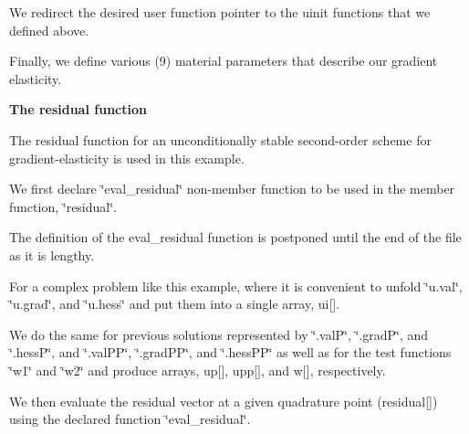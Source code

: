We redirect the desired user function pointer to the {\ttfamily uinit} functions that we defined above.


\begin{DoxyCodeInclude}

\end{DoxyCodeInclude}


Finally, we define various (9) material parameters that describe our gradient elasticity.


\begin{DoxyCodeInclude}

\end{DoxyCodeInclude}


{\bfseries  The {\ttfamily residual} function }

The residual function for an unconditionally stable second-\/order scheme for gradient-\/elasticity is used in this example.

We first declare {\ttfamily \char`\"{}eval\-\_\-residual\char`\"{}} non-\/member function to be used in the member function, {\ttfamily \char`\"{}residual\char`\"{}}.


\begin{DoxyCodeInclude}

\end{DoxyCodeInclude}


The definition of the {\ttfamily eval\-\_\-residual} function is postponed until the end of the file as it is lengthy.

For a complex problem like this example, where it is convenient to unfold \char`\"{}u.\-val\char`\"{}, \char`\"{}u.\-grad\char`\"{}, and \char`\"{}u.\-hess\char`\"{} and put them into a single array, ui\mbox{[}\mbox{]}.


\begin{DoxyCodeInclude}

\end{DoxyCodeInclude}


We do the same for previous solutions represented by \char`\"{}.\-val\-P\char`\"{}, \char`\"{}.\-grad\-P\char`\"{}, and \char`\"{}.\-hess\-P\char`\"{}, and \char`\"{}.\-val\-P\-P\char`\"{}, \char`\"{}.\-grad\-P\-P\char`\"{}, and \char`\"{}.\-hess\-P\-P\char`\"{} as well as for the test functions \char`\"{}w1\char`\"{} and \char`\"{}w2\char`\"{} and produce arrays, up\mbox{[}\mbox{]}, upp\mbox{[}\mbox{]}, and w\mbox{[}\mbox{]}, respectively.

We then evaluate the residual vector at a given quadrature point (residual\mbox{[}\mbox{]}) using the declared function \char`\"{}eval\-\_\-residual\char`\"{}.


